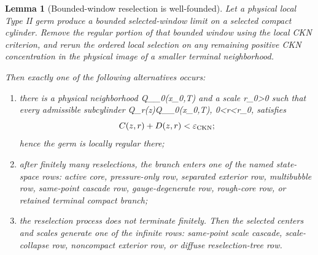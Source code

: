 \documentclass[11pt]{amsart}
\def\({}%
\def\){}%
\theoremstyle{plain}
\newtheorem{lemma}[lemma]{Lemma}
\theoremstyle{definition}
\theoremstyle{remark}
\begin{document}
\begin{lemma}[Bounded-window reselection is well-founded]
\label{paper10:lem:bounded-window-reselection-well-founded}
Let a physical local Type II germ produce a bounded selected-window limit on a
selected compact cylinder.  Remove the regular portion of that bounded window
using the local CKN criterion, and rerun the ordered local selection on any
remaining positive CKN concentration in the physical image of a smaller
terminal neighborhood.

Then exactly one of the following alternatives occurs:
\begin{enumerate}[label=\textup{(\roman*)}]
\item there is a physical neighborhood \(Q_{\rho_0}(x_0,T)\) and a scale
\(r_0>0\) such that every admissible subcylinder
\(Q_r(z)\subset Q_{\rho_0}(x_0,T)\), \(0<r<r_0\), satisfies
\[
   C(z,r)+D(z,r)<\varepsilon_{\rm CKN};
\]
hence the germ is locally regular there;
\item after finitely many reselections, the branch enters one of the named
state-space rows: active core, pressure-only row, separated exterior row,
multibubble row, same-point cascade row, gauge-degenerate row, rough-core row,
or retained terminal compact branch;
\item the reselection process does not terminate finitely.  Then the selected
centers and scales generate one of the infinite rows: same-point scale cascade,
scale-collapse row, noncompact exterior row, or diffuse reselection-tree row.
\end{enumerate}
\end{lemma}
\end{document}

